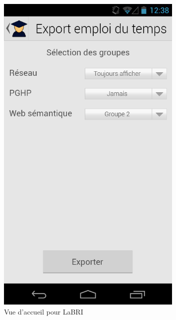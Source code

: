 \documentclass [pdftex,12pt] {report}
\begin{document}
\begin{figure}
  \centering
  \begin{minipage}[t]{8cm}
    \centering
    \includegraphics[width=0.8\textwidth]{resources/ui_preview/09}
    \caption{Vue d'accueil pour LaBRI}
    \label{fig:09}
  \end{minipage}
\end{figure}


\end{document}
